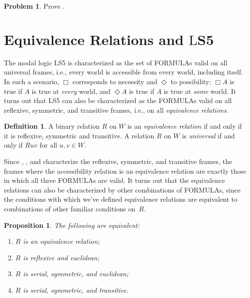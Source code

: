 \documentclass[10pt,a4paper]{article}
\makeatletter
\newcommand*{\olup}[1]{\MakeUppercase{#1}}
\theoremstyle{plain}
\newtheorem{prop}[thm]{Proposition}
\theoremstyle{definition}
\newtheorem{defn}[thm]{Definition}
\newtheorem{prob}{Problem}[section]
\theoremstyle{remark}
\newcommand*{\olfileid}[3]{}
\newcommand*{\olsection}[1]{\section*{#1}}
\newcommand*{\ollabel}[1]{\label{#1}}
\newcommand{\olref}{\@ifnextchar[{\olref@i}{\olref@final}}
\def\olref@i[#1]{\@ifnextchar[{\olref@ii}{\olref@final}}
\def\olref@ii[#1]{\@ifnextchar[{\olref@iii}{\olref@final}}
\def\olref@iii[#1]{\olref@final}
\def\olref@final#1{\ref{#1}}
\providecommand{\Log}{\ensuremath{\mathrm{L}}}
\providecommand{\Ax}{\mathrm{Ax}}
\makeatother
\begin{document}
\begin{prob}
  Prove \olref[nml][frd][def]{prop:relation-facts}.
\end{prob}





\olfileid{nml}{frd}{es5}

\olsection{Equivalence Relations and \Log{S5}}

The modal logic \Log{S5} is characterized as the set of \olup{formula}s
valid on all universal frames, i.e., every world is accessible from
every world, including itself. In such a scenario, $\Box$ corresponds
to necessity and $\Diamond$ to possibility: $\Box A$ is true if $A$
is true at \emph{every} world, and $\Diamond A$ is true if $A$ is
true at \emph{some} world. It turns out that \Log{S5} can also be
characterized as the \olup{formula}s valid on all reflexive, symmetric,
and transitive frames, i.e., on all \emph{equivalence relations}.

\begin{defn}
  A binary relation $R$ on $W$ is an \emph{equivalence relation} if
  and only if it is reflexive, symmetric and transitive.  A relation
  $R$ on $W$ is \emph{universal} if and only if $Ruv$ for all $u,v \in
  W$.
\end{defn}

Since \Ax{T}, \Ax{B}, and \Ax{4} characterize the reflexive,
symmetric, and transitive frames, the frames where the accessibility
relation is an equivalence relation are exactly those in which all
three \olup{formula}s are valid. It turns out that the equivalence
relations can also be characterized by other combinations of
\olup{formula}s, since the conditions with which we've defined
equivalence relations are equivalent to combinations of other familiar
conditions on~$R$.

\begin{prop}\ollabel{prop:equivalences}
  The following are equivalent:
  \begin{enumerate}
  \item $R$ is an equivalence relation;
  \item $R$ is reflexive and euclidean;
  \item $R$ is serial, symmetric, and euclidean;
  \item $R$ is serial, symmetric, and transitive.
  \end{enumerate}
\end{prop}
\end{document}
